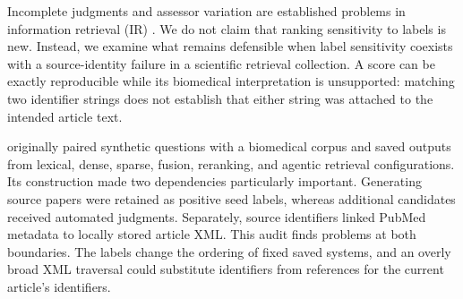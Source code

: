 Incomplete judgments and assessor variation are established problems in information retrieval (IR) \citep{buckley2004incomplete,voorhees2000judgments}. We do not claim that ranking sensitivity to labels is new. Instead, we examine what remains defensible when label sensitivity coexists with a source-identity failure in a scientific retrieval collection. A score can be exactly reproducible while its biomedical interpretation is unsupported: matching two identifier strings does not establish that either string was attached to the intended article text.

\cer originally paired synthetic questions with a biomedical corpus and saved outputs from lexical, dense, sparse, fusion, reranking, and agentic retrieval configurations. Its construction made two dependencies particularly important. Generating source papers were retained as positive seed labels, whereas additional candidates received automated judgments. Separately, source identifiers linked PubMed metadata to locally stored article XML. This audit finds problems at both boundaries. The labels change the ordering of fixed saved systems, and an overly broad XML traversal could substitute identifiers from references for the current article's identifiers.

